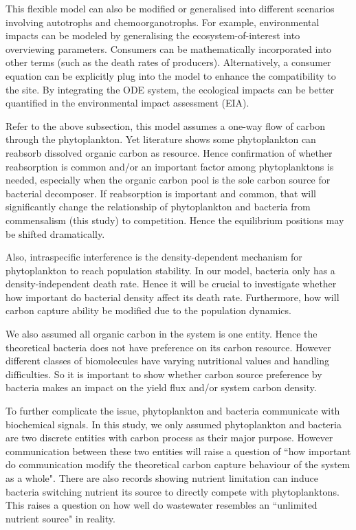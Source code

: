 \documentclass[../thesis.tex]{subfiles} %
\begin{document}
This flexible model can also be modified or generalised into different scenarios involving autotrophs and chemoorganotrophs.  For example, environmental impacts can be modeled by generalising the ecosystem-of-interest into overviewing parameters.  Consumers can be mathematically incorporated into other terms (such as the death rates of producers).\autocite{hurtt1996pelagic}  Alternatively, a consumer equation can be explicitly plug into the model to enhance the compatibility to the site.  By integrating the ODE system, the ecological impacts can be better quantified in the environmental impact assessment (EIA).

Refer to the above subsection, this model assumes a one-way flow of carbon through the phytoplankton.  Yet literature shows some phytoplankton can reabsorb dissolved organic carbon as resource.\autocite{j1989respiration,bratbak1985phytoplankton,samejima1958heterotrophic}  Hence confirmation of whether reabsorption is common and/or an important factor among phytoplanktons is needed, especially when the organic carbon pool is the sole carbon source for bacterial decomposer.  If reabsorption is important and common, that will significantly change the relationship of phytoplankton and bacteria from commensalism (this study) to competition.\autocite{bratbak1985phytoplankton}  Hence the equilibrium positions may be shifted dramatically.

Also, intraspecific interference is the density-dependent mechanism for phytoplankton to reach population stability.\autocite{o2017unexpected,savage2004effects,allen2007recasting,bernhardt2018metabolic}  In our model, bacteria only has a density-independent death rate.  Hence it will be crucial to investigate whether how important do bacterial density affect its death rate.  Furthermore, how will carbon capture ability be modified due to the population dynamics.

We also assumed all organic carbon in the system is one entity.  Hence the theoretical bacteria does not have preference on its carbon resource.  However different classes of biomolecules have varying nutritional values and handling difficulties.\autocite{amon1996bacterial}  So it is important to show whether carbon source preference by bacteria makes an impact on the yield flux and/or system carbon density.

To further complicate the issue, phytoplankton and bacteria communicate with biochemical signals.\autocite{beliaev2014inference,amin2012interactions}  In this study, we only assumed phytoplankton and bacteria are two discrete entities with carbon process as their major purpose.  However communication between these two entities will raise a question of ``how important do communication modify the theoretical carbon capture behaviour of the system as a whole".  There are also records showing nutrient limitation can induce bacteria switching nutrient its source to directly compete with phytoplanktons.\autocite{danger2007bacteria}  This raises a question on how well do wastewater resembles an ``unlimited nutrient source" in reality.
\end{document}
